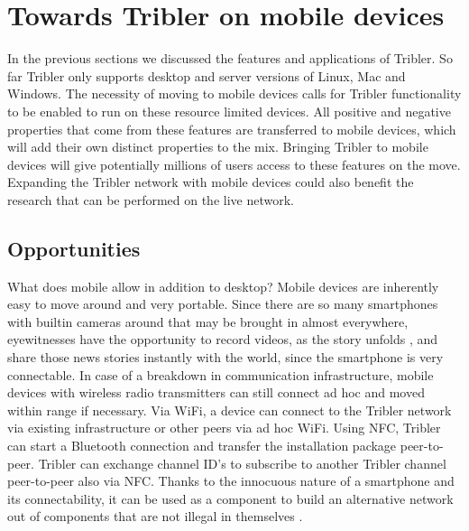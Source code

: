 \section{Towards Tribler on mobile devices}\label{ch:tribler_mobile}
In the previous sections we discussed the features and applications of Tribler.
So far Tribler only supports desktop and server versions of Linux, Mac and Windows.
The necessity of moving to mobile devices calls for Tribler functionality to be enabled to run on these resource limited devices.
All positive and negative properties that come from these features are transferred to mobile devices, which will add their own distinct properties to the mix.
Bringing Tribler to mobile devices will give potentially millions of users access to these features on the move.
Expanding the Tribler network with mobile devices could also benefit the research that can be performed on the live network.



\subsection{Opportunities}
What does mobile allow in addition to desktop?
Mobile devices are inherently easy to move around and very portable.
Since there are so many smartphones with builtin cameras around that may be brought in almost everywhere, eyewitnesses have the opportunity to record videos, as the story unfolds \cite{news_crowd}, and share those news stories instantly with the world, since the smartphone is very connectable.
In case of a breakdown in communication infrastructure, mobile devices with wireless radio transmitters can still connect ad hoc and moved within range if necessary.
Via WiFi, a device can connect to the Tribler network via existing infrastructure or other peers via ad hoc WiFi.
Using NFC, Tribler can start a Bluetooth connection and transfer the installation package peer-to-peer.
Tribler can exchange channel ID's to subscribe to another Tribler channel peer-to-peer also via NFC.
Thanks to the innocuous nature of a smartphone and its connectability, it can be used as a component to build an alternative network out of components that are not illegal in themselves \cite{hasan2013dissent}.


